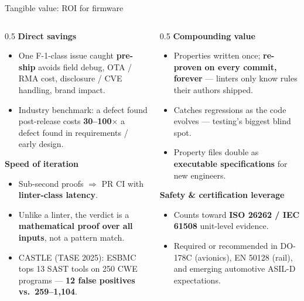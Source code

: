 \documentclass[aspectratio=169,11pt]{beamer}
\newcommand{\hil}[1]{\textbf{\textcolor{nvgreendark}{#1}}}
\begin{document}
\begin{frame}{Tangible value: ROI for firmware}
  \begin{columns}[T,onlytextwidth]
    \begin{column}{0.5\textwidth}
      \footnotesize
      \textbf{Direct savings}
      \begin{itemize}\setlength\itemsep{0.1em}
        \item One F-1-class issue caught \hil{pre-ship} avoids field
              debug, OTA / RMA cost, disclosure / CVE handling, brand impact.
        \item Industry benchmark: a defect found post-release costs
              \hil{30--100$\times$} a defect found in requirements /
              early design.
      \end{itemize}

      \vspace{0.3em}
      \textbf{Speed of iteration}
      \begin{itemize}\setlength\itemsep{0.1em}
        \item Sub-second proofs $\Rightarrow$ PR CI with
              \hil{linter-class latency}.
        \item Unlike a linter, the verdict is a \hil{mathematical proof
              over all inputs}, not a pattern match.
        \item CASTLE (TASE 2025): ESBMC tops 13 SAST tools on 250 CWE
              programs --- \hil{12 false positives vs.\ 259--1{,}104}.
      \end{itemize}
    \end{column}

    \begin{column}{0.5\textwidth}
      \footnotesize
      \textbf{Compounding value}
      \begin{itemize}\setlength\itemsep{0.1em}
        \item Properties written once; \hil{re-proven on every commit, forever}
              --- linters only know rules their authors shipped.
        \item Catches regressions as the code evolves —
              testing's biggest blind spot.
        \item Property files double as
              \hil{executable specifications} for new engineers.
      \end{itemize}

      \vspace{0.3em}
      \textbf{Safety \& certification leverage}
      \begin{itemize}\setlength\itemsep{0.1em}
        \item Counts toward \hil{ISO 26262 / IEC 61508} unit-level evidence.
        \item Required or recommended in DO-178C (avionics),
              EN 50128 (rail), and emerging automotive ASIL-D expectations.
      \end{itemize}
    \end{column}
  \end{columns}


\end{frame}
\end{document}

